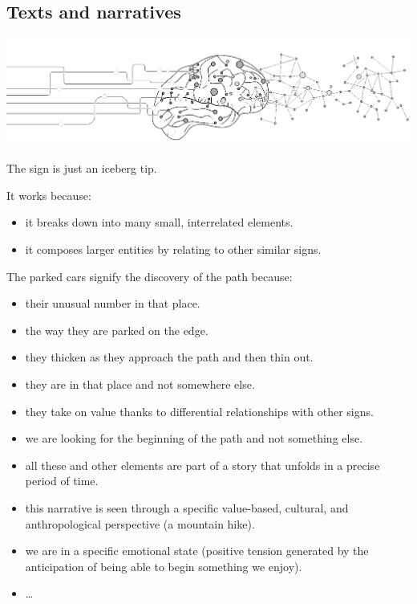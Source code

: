 \subsection{Texts and narratives}\label{texts-and-narratives}

\begin{center}
\includegraphics[scale=0.8]{../img/neuro.png}
\end{center}

The sign is just an iceberg tip.

It works because:

\begin{itemize}
\tightlist
\item it breaks down into many small, interrelated elements.
\item it composes larger entities by relating to other similar signs.
\end{itemize}

The parked cars signify the discovery of the path because:

\begin{itemize}
\tightlist
\item their unusual number in that place.
\item the way they are parked on the edge.
\item they thicken as they approach the path and then thin out.
\item they are in that place and not somewhere else.
\item they take on value thanks to differential relationships with other signs.
\item we are looking for the beginning of the path and not something else.
\item all these and other elements are part of a story that unfolds in a precise period of time.
\item this narrative is seen through a specific value-based, cultural, and anthropological perspective (a mountain hike).
\item we are in a specific emotional state (positive tension generated by the anticipation of being able to begin something we enjoy).
\item
  \ldots{}
\end{itemize}

